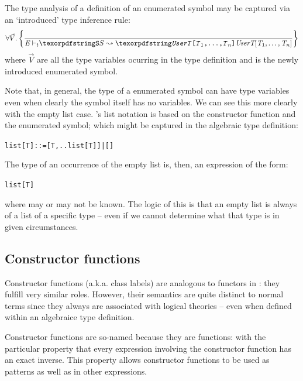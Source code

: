 The type analysis of a definition of an enumerated symbol may be captured via an `introduced' type inference rule:
\begin{equation*}
\forall \vec{V}.\left\{\frac{}
{\typeprd{E}{\q{S}}{\q{\emph{UserT}[\emph{T}\sub1,\dots,\emph{T}\subn]}}}\right\}
\end{equation*}
where $\vec{V}$ are all the type variables ocurring in the type definition and  is the newly introduced enumerated symbol.

Note that, in general, the type of a enumerated symbol can have type variables even when clearly the symbol itself has no variables. We can see this more clearly with the empty list case. \go's list notation is based on the  constructor function and the \q{[]} enumerated symbol; which might be captured in the algebraic type definition:
\begin{alltt}
list[T] ::= [T,..list[T]] | []
\end{alltt}
The type of an occurrence of the empty list is, then, an expression of the form:
\begin{alltt}
list[T]
\end{alltt}
where  may or may not be known. The logic of this is that an empty list is always of a list of a specific type -- even if we cannot determine what that type is in given circumstances.

\subsection{Constructor functions}
\label{type:constructor}

Constructor functions (a.k.a. class labels) are analogous to functors in \prolog: they fulfill very similar roles. However, their semantics are quite distinct to normal \prolog terms since they always are associated with logical theories -- even when defined within an algebraice type definition.

\begin{aside}
  Constructor functions are so-named because they are functions: with the
  particular property that every expression involving the constructor function
  has an exact inverse. This property allows constructor functions to be used as
  patterns as well as in other expressions.
\end{aside}

